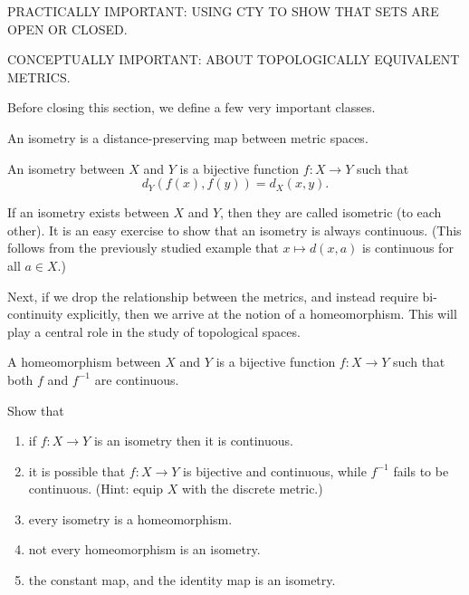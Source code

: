 PRACTICALLY IMPORTANT: USING CTY TO SHOW THAT SETS ARE OPEN OR CLOSED.

CONCEPTUALLY IMPORTANT: ABOUT TOPOLOGICALLY EQUIVALENT METRICS.

Before closing this section, we define a few very important classes.

An isometry is a distance-preserving map between metric spaces.
\begin{ndfn}[Isometry]
  An isometry between $X$ and $Y$ is a bijective function $f:X \to Y$ such that
  \begin{equation*}
    d_{Y}(f(x), f(y)) = d_{X}(x, y).
  \end{equation*}
\end{ndfn}
If an isometry exists between $X$ and $Y$, then they are called isometric (to each other). It is an easy exercise to show that an isometry is always continuous. (This follows from the previously studied example that $x \mapsto d(x,a)$ is continuous for all $a \in X$.)

Next, if we drop the relationship between the metrics, and instead require bi-continuity explicitly, then we arrive at the notion of a homeomorphism. This will play a central role in the study of topological spaces.
\begin{ndfn}[Homeomorphism]
  A homeomorphism between $X$ and $Y$ is a bijective function $f:X \to Y$ such that both $f$ and $f^{-1}$ are continuous.
\end{ndfn}

\begin{exercise}
Show that
\begin{enumerate}
\item if $f: X \to Y$ is an isometry then it is continuous.
\item it is possible that $f: X \to Y$ is bijective and continuous, while $f^{-1}$ fails to be continuous. (Hint: equip $X$ with the discrete metric.)
\item every isometry is a homeomorphism.
\item not every homeomorphism is an isometry.
\item the constant map, and the identity map is an isometry.
\end{enumerate}
\end{exercise}